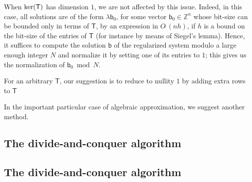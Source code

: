 \documentclass{sig-alternate}
\newcommand{\vb}{\ensuremath{\mathsf{b}}}
\newcommand{\mT}{\ensuremath{\mathsf{T}}}
\newcommand{\Z}{\ensuremath{\mathbb{Z}}}
\newcommand{\Otilde}[1]{\ensuremath{O\tilde{~}(#1)}} %
\begin{document}
When ${\rm ker}(\mT)$ has dimension $1$, we are not affected by this
issue. Indeed, in this case, all solutions are of the form $\lambda
\vb_0$, for some vector $\vb_0 \in \Z^n$ whose bit-size can be bounded
only in terms of $\mT$, by an expression in $\Otilde{n h}$, if $h$ is
a bound on the bit-size of the entries of $\mT$ (for instance by means 
of Siegel's lemma). Hence, it suffices to compute the solution $\vb$ 
of the regularized system modulo a large enough integer $N$
and normalize it by setting one of its entries to $1$;
this gives us the normalization of $\vb_0 \bmod N$.

For an arbitrary $\mT$, our suggestion is to reduce to 
nullity $1$ by adding extra rows to $\mT$

In the important particular case of algebraic approximation,
we suggest another method.


\subsection{The divide-and-conquer algorithm}


\subsection{The divide-and-conquer algorithm}





 {\scriptsize }
\end{document}
